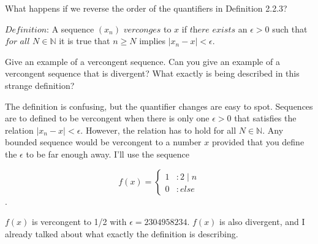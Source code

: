 \documentclass[12pt]{article}
\newcommand{\N}{\mathbb{N}}
\newenvironment{exercise}[2][Exercise]{\begin{trivlist}
\item[\hskip \labelsep {\bfseries #1}\hskip \labelsep {\bfseries #2.}]}{\end{trivlist}}
\begin{document}
\begin{exercise}{2.2.2}
What happens if we reverse the order of the quantifiers in Definition 2.2.3?

$\textit{Definition:}$ A sequence $(x_n)$ $\textit{verconges}$ to $x$ if $\textit{there exists}$ an $\epsilon > 0$ such that $\textit{for all}$ $N \in \N$ it is true that $n \geq N$ implies $|x_n-x| < \epsilon$.

Give an example of a vercongent sequence. Can you give an example of a vercongent sequence that is divergent? What exactly is being described in this strange definition? 
\end{exercise}

\noindent The definition is confusing, but the quantifier changes are easy to spot. Sequences are to defined to be vercongent when there is only one $\epsilon > 0$ that satisfies the relation $\left|x_n - x \right| < \epsilon$. However, the relation has to hold for all $N \in \N$. Any bounded sequence would be vercongent to a number $x$ provided that you define the $\epsilon$ to be far enough away. I'll use the sequence

\begin{displaymath}
f(x) = \left\{
\begin{array}{lr}
1 & : 2 \mid n  \\
0 & : else
\end{array}
\right.
\end{displaymath}.

$f(x)$ is vercongent to 1/2 with $\epsilon = 2304958234$. $f(x)$ is also divergent, and I already talked about what exactly the definition is describing. 


 
 
\end{document}
